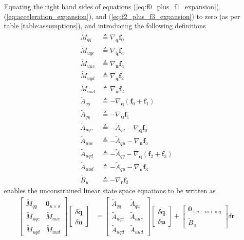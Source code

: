 \documentclass{svjour3}                     %
\begin{document}
Equating the right hand sides of equations (\ref{eq:f0_plus_f1_expansion}),
(\ref{eq:acceleration_expansion}),
and (\ref{eq:f2_plus_f3_expansion}) to zero (as per table
\ref{table:assumptions}), and introducing the following definitions
\begin{align}
\tilde{M}_{qq}  &\triangleq \nabla_{\bm{\dot{q}}}\bm{f}_0 \\
\tilde{M}_{uqc} &\triangleq \nabla_{\bm{\dot{q}}}\bm{f}_a \\
\tilde{M}_{uuc} &\triangleq \nabla_{\bm{\dot{u}}}\bm{f}_a \\
\tilde{M}_{uqd} &\triangleq \nabla_{\bm{\dot{q}}}\bm{f}_2 \\
\tilde{M}_{uud} &\triangleq \nabla_{\bm{\dot{u}}}\bm{f}_2 \\
\tilde{A}_{qq}  &\triangleq -\nabla_{\bm{q}}(\bm{f}_0 + \bm{f}_1) \\
\tilde{A}_{qu}  &\triangleq -\nabla_{\bm{u}}\bm{f}_1 \\
\tilde{A}_{uqc} &\triangleq -\tilde{A}_{qq} - \nabla_{\bm{q}} \bm{f}_a \\
\tilde{A}_{uuc} &\triangleq -\tilde{A}_{qu} - \nabla_{\bm{u}} \bm{f}_a \\
\tilde{A}_{uqd} &\triangleq -\tilde{A}_{qq} - \nabla_{\bm{q}} (\bm{f}_2 + \bm{f}_3) \\
\tilde{A}_{uud} &\triangleq -\tilde{A}_{qu} - \nabla_{\bm{u}} \bm{f}_3 \\
\tilde{B}_{u}   &\triangleq -\nabla_{\bm{r}}\bm{f}_{3}
\end{align}
enables the unconstrained linear state space equations to be written as
\begin{align}
  \label{eq:state_space_unconstrained}
  \left[
    \begin{array}{cc}
      \tilde{M}_{qq} & \bm{0}_{n \times o} \\
      \tilde{M}_{uqc} & \tilde{M}_{uuc} \\
      \tilde{M}_{uqd} & \tilde{M}_{uud}
    \end{array}
    \right]
    \left[
      \begin{array}{c}
        \delta \bm{\dot{q}} \\
        \delta \bm{\dot{u}}
      \end{array}
    \right]
   &=
   \left[
     \begin{array}{cc}
       \tilde{A}_{qq} & \tilde{A}_{qu} \\
       \tilde{A}_{uqc} & \tilde{A}_{uuc} \\
       \tilde{A}_{uqd} & \tilde{A}_{uud}
     \end{array}
   \right]
    \left[
      \begin{array}{c}
        \delta \bm{q} \\
        \delta \bm{u}
      \end{array}
    \right]
    +
    \left[
      \begin{array}{c}
        \bm{0}_{(n + m) \times q} \\
        \tilde{B}_{u}
      \end{array}
    \right]
    \delta \bm{r}
\end{align}
\end{document}
